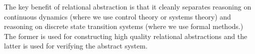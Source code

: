 \documentclass{llncs}
\begin{document}
The key benefit of relational abstraction
is that it cleanly separates reasoning on continuous
dynamics (where we use control theory or systems theory)
and
reasoning on discrete state transition systems (where we use 
formal methods.)
The former is used for constructing high quality relational abstractions
and the latter is used for verifying the abstract system.

\end{document}
